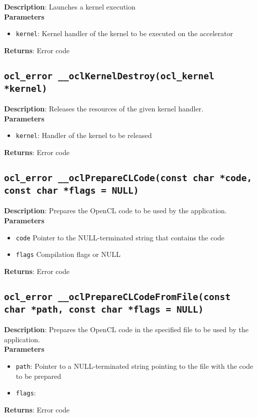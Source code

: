 \textbf{Description}: Launches a kernel execution\\
\textbf{Parameters}
\begin{itemize}
  \item \texttt{kernel}: Kernel handler of the kernel to be executed on the accelerator
\end{itemize}
\textbf{Returns}: Error code

\subsection{\texttt{ocl\_error \_\_oclKernelDestroy(ocl\_kernel *kernel)}}

\textbf{Description}: Releases the resources of the given kernel handler. \\
\textbf{Parameters}
\begin{itemize}
  \item \texttt{kernel}: Handler of the kernel to be released
\end{itemize}
\textbf{Returns}: Error code


\subsection{\texttt{ocl\_error \_\_oclPrepareCLCode(const char *code, const char *flags = NULL)}}

\textbf{Description}: Prepares the OpenCL code to be used by the application. \\
\textbf{Parameters}
\begin{itemize}
  \item \texttt{code} Pointer to the NULL-terminated string that contains the code
  \item \texttt{flags} Compilation flags or NULL
\end{itemize}
\textbf{Returns}: Error code

\subsection{\texttt{ocl\_error \_\_oclPrepareCLCodeFromFile(const char *path, const char *flags = NULL)}}

\textbf{Description}: Prepares the OpenCL code in the specified file to be used by the application.  \\
\textbf{Parameters}
\begin{itemize}
  \item \texttt{path}: Pointer to a NULL\hyp{}terminated string pointing to the file with the code 
 to be prepared
  \item \texttt{flags}: \end{itemize}
\textbf{Returns}: Error code

